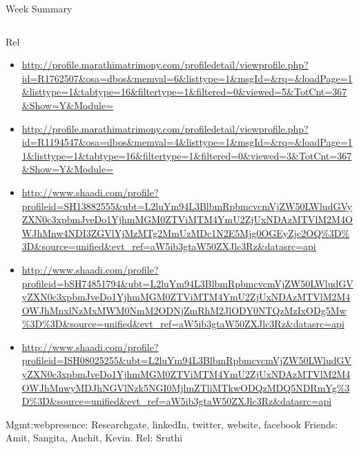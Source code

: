 \documentclass[serif, mathserif, final]{beamer}
\begin{document}
\begin{frame}
\begin{columns}
\begin{column}{0.5\linewidth}
\begin{block}{Week Summary}
\begin{column}{0.25\linewidth}
\begin{block}{Rel}
\begin{itemize}
\item \small \url{http://profile.marathimatrimony.com/profiledetail/viewprofile.php?id=R1762507&osa=dbos&memval=6&listtype=1&msgId=&rq=&loadPage=1&listtype=1&tabtype=16&filtertype=1&filtered=0&viewed=5&TotCnt=367&Show=Y&Module=}

\item \small \url{http://profile.marathimatrimony.com/profiledetail/viewprofile.php?id=R1194547&osa=dbos&memval=4&listtype=1&msgId=&rq=&loadPage=11&listtype=1&tabtype=16&filtertype=1&filtered=0&viewed=3&TotCnt=367&Show=Y&Module=}

\item \small \url{http://www.shaadi.com/profile?profileid=SH13882555&ubt=L2luYm94L3BlbmRpbmcvcmVjZW50LWludGVyZXN0c3xpbmJveDo1YjhmMGM0ZTViMTM4YmU2ZjUxNDAzMTVlM2M4OWJhMnw4NDI3ZGVlYjMzMTg2MmUzMDc1N2E5Mjg0OGEyZjc2OQ\%3D\%3D&source=unified&evt_ref=aW5ib3gtaW50ZXJlc3Rz&datasrc=api}

\item \small \url{http://www.shaadi.com/profile?profileid=bSH74851794&ubt=L2luYm94L3BlbmRpbmcvcmVjZW50LWludGVyZXN0c3xpbmJveDo1YjhmMGM0ZTViMTM4YmU2ZjUxNDAzMTVlM2M4OWJhMnxlNzMxMWM0NmM2ODNjZmRhM2JlODY0NTQzMzIxODg5Mw\%3D\%3D&source=unified\&evt_ref=aW5ib3gtaW50ZXJlc3Rz&datasrc=api}

\item \small \url{http://www.shaadi.com/profile?profileid=ISH08025255&ubt=L2luYm94L3BlbmRpbmcvcmVjZW50LWludGVyZXN0c3xpbmJveDo1YjhmMGM0ZTViMTM4YmU2ZjUxNDAzMTVlM2M4OWJhMnwyMDJhNGVlNzk5NGI0MjlmZTliMTkwODQzMDQ5NDRmYg\%3D\%3D&source=unified&evt_ref=aW5ib3gtaW50ZXJlc3Rz&datasrc=api} 
\end{itemize} 
\end{block} 

\begin{block} 
Mgmt:webpresence: 
Researchgate, linkedIn, twitter, website, facebook 
Friends: Amit, Sangita, Anchit, Kevin. 
Rel: Sruthi 
\end{block} 

\end{column}%







\end{block}
\end{column}
\end{columns}
\end{frame}
\end{document}

